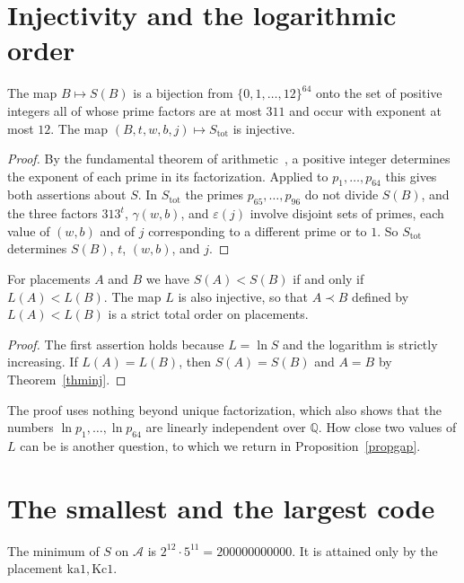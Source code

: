 \documentclass[12pt,reqno]{article}
\newcommand{\QQ}{\mathbb{Q}}
\newcommand{\adm}{\mathcal{A}}
\newcommand{\sq}[1]{\mathrm{#1}}
\begin{document}
\section{Injectivity and the logarithmic order}\label{secorder}

\begin{theorem}\label{thminj}
The map $B\mapsto S(B)$ is a bijection from $\{0,1,\ldots,12\}^{64}$ onto the set of positive
integers all of whose prime factors are at most $311$ and occur with exponent at most $12$.
The map $(B,t,w,b,j)\mapsto S_{\mathrm{tot}}$ is injective.
\end{theorem}

\begin{proof}
By the fundamental theorem of arithmetic~\cite[Thm.\ 2]{hardy}, a positive integer determines
the exponent of each prime in its factorization. Applied to $p_1,\ldots,p_{64}$ this gives both
assertions about $S$. In $S_{\mathrm{tot}}$ the primes $p_{65},\ldots,p_{96}$ do not divide
$S(B)$, and the three factors $313^t$, $\gamma(w,b)$, and $\varepsilon(j)$ involve disjoint sets
of primes, each value of $(w,b)$ and of $j$ corresponding to a different prime or to $1$. So
$S_{\mathrm{tot}}$ determines $S(B)$, $t$, $(w,b)$, and $j$.
\end{proof}

\begin{theorem}\label{thmorder}
For placements $A$ and $B$ we have $S(A)<S(B)$ if and only if $L(A)<L(B)$. The map $L$ is also
injective, so that $A\prec B$ defined by $L(A)<L(B)$ is a strict total order on placements.
\end{theorem}

\begin{proof}
The first assertion holds because $L=\ln S$ and the logarithm is strictly increasing. If
$L(A)=L(B)$, then $S(A)=S(B)$ and $A=B$ by Theorem~\ref{thminj}.
\end{proof}

The proof uses nothing beyond unique factorization, which also shows that the numbers
$\ln p_1,\ldots,\ln p_{64}$ are linearly independent over $\QQ$. How close two values of $L$
can be is another question, to which we return in Proposition~\ref{propgap}.

\section{The smallest and the largest code}\label{secext}

\begin{theorem}\label{thmmin}
The minimum of $S$ on $\adm$ is $2^{12}\cdot 5^{11}=200000000000$. It is attained only by the
placement $\sq{ka1},\sq{Kc1}$.
\end{theorem}
\end{document}
